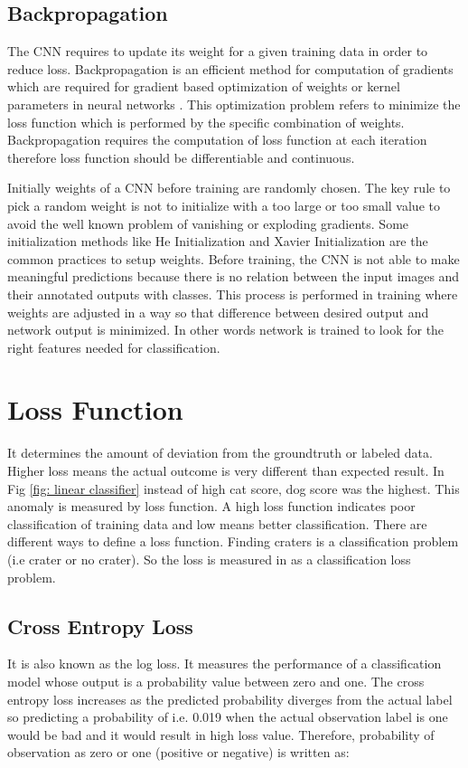 \documentclass[11pt]{article}
\begin{document}
\subsection{Backpropagation}
The CNN requires to update its weight for a given training data in order to reduce loss. Backpropagation is an efficient method for computation of gradients which are required for gradient based optimization of weights or kernel parameters in neural networks \cite{rumelhart1988learning}. This optimization problem refers to minimize the loss function which is performed by the specific combination of weights. Backpropagation requires the computation of loss function at each iteration therefore loss function should be differentiable and continuous.  

Initially weights of a CNN before training are randomly chosen. The key rule to pick a random weight is not to initialize with a too large or too small value to avoid the well known problem of vanishing or exploding gradients. Some initialization methods like He Initialization and Xavier Initialization are the common practices to setup weights. Before training, the CNN is not able to make meaningful predictions because there is no relation between the input images and their annotated outputs with classes. This process is performed in training where weights are adjusted in a way so that difference between desired output and network output is minimized. In other words network is trained to look for the right features needed for classification.






\section{Loss Function}
It determines the amount of deviation from the groundtruth or labeled data. Higher loss means the actual outcome is very different than expected result. In Fig \ref{fig: linear classifier} instead of high cat score, dog score was the highest. This anomaly is measured by loss function. A high loss function indicates poor classification of training data and low means better classification. There are different ways to define a loss function. Finding craters is a classification problem (i.e crater or no crater). So the loss is measured in as a classification loss problem.

\subsection{Cross Entropy Loss}
It is also known as the log loss. It measures the performance of a classification model whose output is a probability value between zero and one. The cross entropy loss increases as the predicted probability diverges from the actual label so predicting a probability of i.e. 0.019 when the actual observation label is one would be bad and it would result in high loss value. Therefore, probability of observation as zero or one (positive or negative) is written as:
\end{document}
